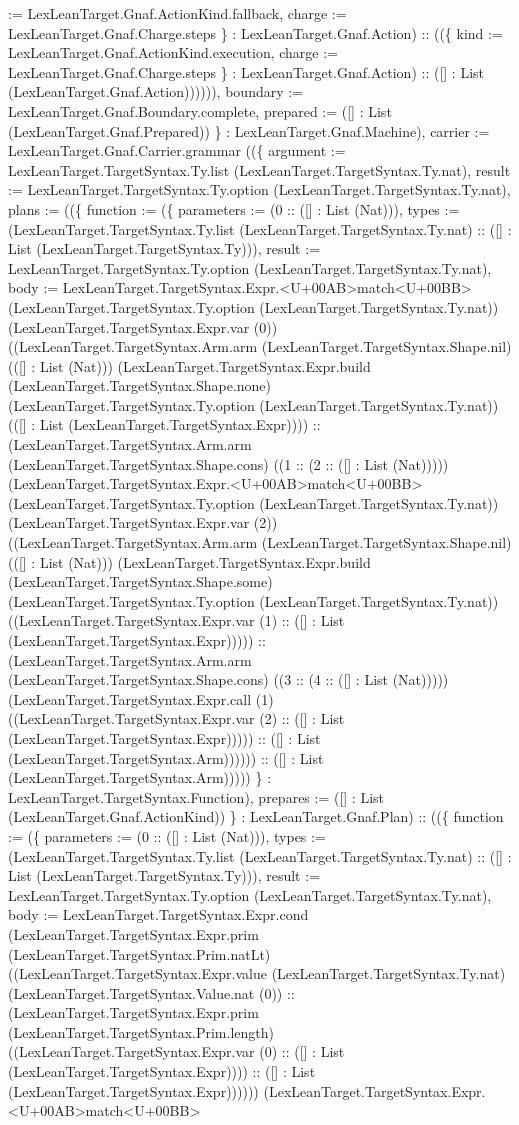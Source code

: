 \documentclass[11pt]{article}
\begin{document}
:= LexLeanTarget.Gnaf.ActionKind.fallback, charge := LexLeanTarget.Gnaf.Charge.steps \} : LexLeanTarget.Gnaf.Action) :: ((\{ kind := LexLeanTarget.Gnaf.ActionKind.execution, charge := LexLeanTarget.Gnaf.Charge.steps \} : LexLeanTarget.Gnaf.Action) :: ([] : List (LexLeanTarget.Gnaf.Action)))))), boundary := LexLeanTarget.Gnaf.Boundary.complete, prepared := ([] : List (LexLeanTarget.Gnaf.Prepared)) \} : LexLeanTarget.Gnaf.Machine), carrier := LexLeanTarget.Gnaf.Carrier.grammar ((\{ argument := LexLeanTarget.TargetSyntax.Ty.list (LexLeanTarget.TargetSyntax.Ty.nat), result := LexLeanTarget.TargetSyntax.Ty.option (LexLeanTarget.TargetSyntax.Ty.nat), plans := ((\{ function := (\{ parameters := (0 :: ([] : List (Nat))), types := (LexLeanTarget.TargetSyntax.Ty.list (LexLeanTarget.TargetSyntax.Ty.nat) :: ([] : List (LexLeanTarget.TargetSyntax.Ty))), result := LexLeanTarget.TargetSyntax.Ty.option (LexLeanTarget.TargetSyntax.Ty.nat), body := LexLeanTarget.TargetSyntax.Expr.<U+00AB>match<U+00BB> (LexLeanTarget.TargetSyntax.Ty.option (LexLeanTarget.TargetSyntax.Ty.nat)) (LexLeanTarget.TargetSyntax.Expr.var (0)) ((LexLeanTarget.TargetSyntax.Arm.arm (LexLeanTarget.TargetSyntax.Shape.nil) (([] : List (Nat))) (LexLeanTarget.TargetSyntax.Expr.build (LexLeanTarget.TargetSyntax.Shape.none) (LexLeanTarget.TargetSyntax.Ty.option (LexLeanTarget.TargetSyntax.Ty.nat)) (([] : List (LexLeanTarget.TargetSyntax.Expr)))) :: (LexLeanTarget.TargetSyntax.Arm.arm (LexLeanTarget.TargetSyntax.Shape.cons) ((1 :: (2 :: ([] : List (Nat))))) (LexLeanTarget.TargetSyntax.Expr.<U+00AB>match<U+00BB> (LexLeanTarget.TargetSyntax.Ty.option (LexLeanTarget.TargetSyntax.Ty.nat)) (LexLeanTarget.TargetSyntax.Expr.var (2)) ((LexLeanTarget.TargetSyntax.Arm.arm (LexLeanTarget.TargetSyntax.Shape.nil) (([] : List (Nat))) (LexLeanTarget.TargetSyntax.Expr.build (LexLeanTarget.TargetSyntax.Shape.some) (LexLeanTarget.TargetSyntax.Ty.option (LexLeanTarget.TargetSyntax.Ty.nat)) ((LexLeanTarget.TargetSyntax.Expr.var (1) :: ([] : List (LexLeanTarget.TargetSyntax.Expr))))) :: (LexLeanTarget.TargetSyntax.Arm.arm (LexLeanTarget.TargetSyntax.Shape.cons) ((3 :: (4 :: ([] : List (Nat))))) (LexLeanTarget.TargetSyntax.Expr.call (1) ((LexLeanTarget.TargetSyntax.Expr.var (2) :: ([] : List (LexLeanTarget.TargetSyntax.Expr))))) :: ([] : List (LexLeanTarget.TargetSyntax.Arm)))))) :: ([] : List (LexLeanTarget.TargetSyntax.Arm))))) \} : LexLeanTarget.TargetSyntax.Function), prepares := ([] : List (LexLeanTarget.Gnaf.ActionKind)) \} : LexLeanTarget.Gnaf.Plan) :: ((\{ function := (\{ parameters := (0 :: ([] : List (Nat))), types := (LexLeanTarget.TargetSyntax.Ty.list (LexLeanTarget.TargetSyntax.Ty.nat) :: ([] : List (LexLeanTarget.TargetSyntax.Ty))), result := LexLeanTarget.TargetSyntax.Ty.option (LexLeanTarget.TargetSyntax.Ty.nat), body := LexLeanTarget.TargetSyntax.Expr.cond (LexLeanTarget.TargetSyntax.Expr.prim (LexLeanTarget.TargetSyntax.Prim.natLt) ((LexLeanTarget.TargetSyntax.Expr.value (LexLeanTarget.TargetSyntax.Ty.nat) (LexLeanTarget.TargetSyntax.Value.nat (0)) :: (LexLeanTarget.TargetSyntax.Expr.prim (LexLeanTarget.TargetSyntax.Prim.length) ((LexLeanTarget.TargetSyntax.Expr.var (0) :: ([] : List (LexLeanTarget.TargetSyntax.Expr)))) :: ([] : List (LexLeanTarget.TargetSyntax.Expr)))))) (LexLeanTarget.TargetSyntax.Expr.<U+00AB>match<U+00BB> 
\end{document}
